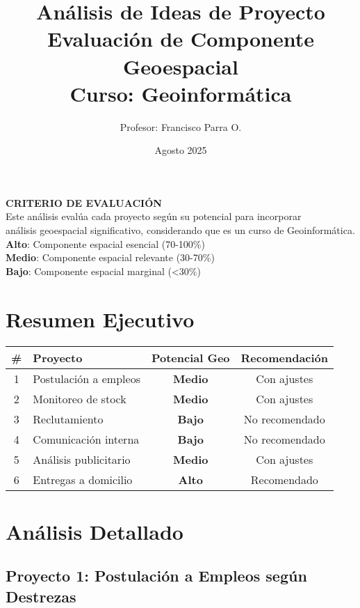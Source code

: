 \documentclass[11pt,a4paper]{article}
\title{{\Huge \textbf{Análisis de Ideas de Proyecto}}\\[0.5cm]
{\Large Evaluación de Componente Geoespacial}\\[0.3cm]
{\large Curso: Geoinformática}}
\author{Profesor: Francisco Parra O.}
\date{Agosto 2025}
\newcommand{\alto}[1]{\textcolor{verde}{\textbf{#1}}}
\newcommand{\medio}[1]{\textcolor{amarillo}{\textbf{#1}}}
\newcommand{\bajo}[1]{\textcolor{rojo}{\textbf{#1}}}
\begin{document}
\maketitle
\thispagestyle{empty}

\begin{tcolorbox}[colframe=usachblue,colback=blue!5]
\centering
\textbf{CRITERIO DE EVALUACIÓN}\\[0.3cm]
Este análisis evalúa cada proyecto según su potencial para incorporar\\
análisis geoespacial significativo, considerando que es un curso de Geoinformática.\\[0.2cm]
\alto{Alto}: Componente espacial esencial (70-100\%)\\
\medio{Medio}: Componente espacial relevante (30-70\%)\\
\bajo{Bajo}: Componente espacial marginal (<30\%)
\end{tcolorbox}

\newpage

\section{Resumen Ejecutivo}

\begin{table}[h]
\centering
\begin{tabular}{clcc}
\toprule
\textbf{\#} & \textbf{Proyecto} & \textbf{Potencial Geo} & \textbf{Recomendación} \\
\midrule
1 & Postulación a empleos & \medio{Medio} & Con ajustes \\
2 & Monitoreo de stock & \medio{Medio} & Con ajustes \\
3 & Reclutamiento & \bajo{Bajo} & No recomendado \\
4 & Comunicación interna & \bajo{Bajo} & No recomendado \\
5 & Análisis publicitario & \medio{Medio} & Con ajustes \\
6 & Entregas a domicilio & \alto{Alto} & Recomendado \\
\bottomrule
\end{tabular}
\end{table}

\section{Análisis Detallado}

\subsection{Proyecto 1: Postulación a Empleos según Destrezas}
\end{document}
